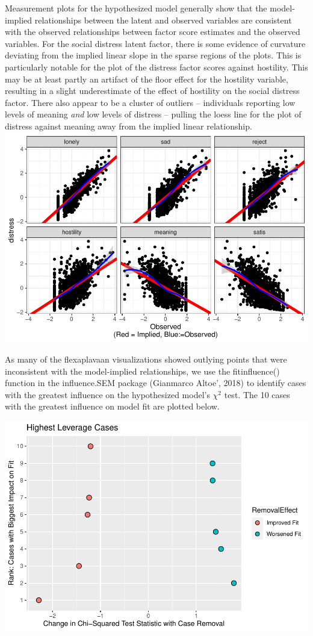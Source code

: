 \documentclass[
  english,
  doc]{apa6}
\begin{document}
Measurement plots for the hypothesized model generally show that the model-implied relationships between the latent and observed variables are consistent with the observed relationships between factor score estimates and the observed variables. For the social distress latent factor, there is some evidence of curvature deviating from the implied linear slope in the sparse regions of the plots. This is particularly notable for the plot of the distress factor scores against hostility. This may be at least partly an artifact of the floor effect for the hostility variable, resulting in a slight underestimate of the effect of hostility on the social distress factor. There also appear to be a cluster of outliers -- individuals reporting low levels of meaning \emph{and} low levels of distress -- pulling the loess line for the plot of distress against meaning away from the implied linear relationship.\\
\includegraphics{flexplavaan_draft_files/figure-latex/unnamed-chunk-7-1.pdf}

As many of the flexaplavaan visualizations showed outlying points that were inconsistent with the model-implied relationships, we use the fitinfluence() function in the influence.SEM package (Gianmarco Altoe', 2018) to identify cases with the greatest influence on the hypothesized model's \(\chi^2\) test. The 10 cases with the greatest influence on model fit are plotted below.

\includegraphics{flexplavaan_draft_files/figure-latex/unnamed-chunk-8-1.pdf}
\end{document}
